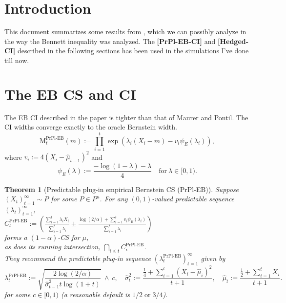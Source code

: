 \documentclass{article}
\renewcommand{\leq}{\leqslant}
\newtheorem{theorem}{Theorem}
\renewcommand{\thetheorem}{3}
\begin{document}
\section{Introduction}
This document summarizes some results from \cite{WauRam24a}, which we can possibly analyze in the way the Bennett inequality was analyzed. The \textbf{[PrPl-EB-CI]} and \textbf{[Hedged-CI]} described in the following sections has been used in the simulations I've done till now.
\section{The EB CS and CI}
The EB CI described in the paper is tighter than that of Maurer and Pontil. The CI widths converge exactly to the oracle Bernstein width. 
\setcounter{equation}{12}
\begin{equation} \label{eq:13}
    \text{M}^{\text{PrPl-EB}}_t (m) := \prod_{i=1}^{t} \exp\left( \lambda_i (X_i - m) - v_i \psi_E(\lambda_i) \right),
\end{equation}
where 
$
    v_i := 4 (X_i - \hat{\mu}_{i-1})^2
$
and
\begin{equation} \label{eq:14}
    \psi_E(\lambda) := \frac{-\log(1 - \lambda) - \lambda}{4} \quad \text{for} \ \lambda \in [0, 1).
\end{equation}
\renewcommand{\thetheorem}{2} 
\begin{theorem}[Predictable plug-in empirical Bernstein CS (PrPl-EB)] \label{thm:PrPl-EB}
Suppose \( (X_t)_{t=1}^{\infty} \sim P \) for some \( P \in P^{\mu} \). For any \( (0,1) \)-valued predictable sequence \( (\lambda_t)_{t=1}^{\infty} \),  \\

$ C_t^{\text{PrPl-EB}} :=
   \left( \frac{\sum_{i=1}^{t} \lambda_i X_i}{\sum_{i=1}^{t} \lambda_i}
    \pm \frac{\log (2/\alpha) + \sum_{i=1}^{t} v_i \psi_E(\lambda_i)}{\sum_{i=1}^{t} \lambda_i} \right)$ \\
    
forms a \( (1 - \alpha) \)-CS for \( \mu \),  \\

as does its running intersection, \( \bigcap_{i \leq t} C_i^{\text{PrPl-EB}} \).\\

They recommend the predictable plug-in sequence \( (\lambda_t^{\text{PrPl-EB}})_{t=1}^{\infty} \) given by
\begin{equation} \label{eq:15}
    \lambda_t^{\text{PrPl-EB}} := 
    \sqrt{\frac{2 \log(2/\alpha)}{\hat{\sigma}^2_{t-1} t \log(1 + t)}} \
    \wedge \ c,  \quad
    \hat{\sigma}^2_t := \frac{\frac{1}{4} + \sum_{i=1}^{t} (X_i - \hat{\mu}_i)^2}{t+1},  
    \quad \hat{\mu}_t := \frac{\frac{1}{2} + \sum_{i=1}^{t} X_i}{t+1}.
\end{equation}
for some \( c \in [0,1) \) (a reasonable default is \( 1/2 \;\text{or}\; 3/4 \)).
\end{theorem}
\end{document}
